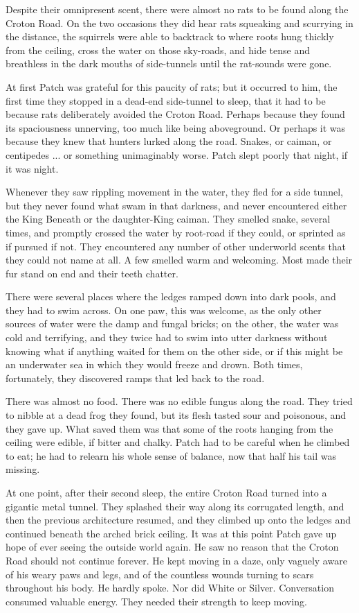 \documentclass[11pt]{article}
\begin{document}
 Despite their omnipresent scent, there were almost no rats to be found along the Croton Road. On the two occasions they did hear rats squeaking and scurrying in the distance, the squirrels were able to backtrack to where roots hung thickly from the ceiling, cross the water on those sky-roads, and hide tense and breathless in the dark mouths of side-tunnels until the rat-sounds were gone.\par
At first Patch was grateful for this paucity of rats; but it occurred to him, the first time they stopped in a dead-end side-tunnel to sleep, that it had to be because rats deliberately avoided the Croton Road. Perhaps because they found its spaciousness unnerving, too much like being aboveground. Or perhaps it was because they knew that hunters lurked along the road. Snakes, or caiman, or centipedes ... or something unimaginably worse. Patch slept poorly that night, if it was night.\par
Whenever they saw rippling movement in the water, they fled for a side tunnel, but they never found what swam in that darkness, and never encountered either the King Beneath or the daughter-King caiman. They smelled snake, several times, and promptly crossed the water by root-road if they could, or sprinted as if pursued if not. They encountered any number of other underworld scents that they could not name at all. A few smelled warm and welcoming. Most made their fur stand on end and their teeth chatter.\par
There were several places where the ledges ramped down into dark pools, and they had to swim across. On one paw, this was welcome, as the only other sources of water were the damp and fungal bricks; on the other, the water was cold and terrifying, and they twice had to swim into utter darkness without knowing what if anything waited for them on the other side, or if this might be an underwater sea in which they would freeze and drown. Both times, fortunately, they discovered ramps that led back to the road.\par
There was almost no food. There was no edible fungus along the road. They tried to nibble at a dead frog they found, but its flesh tasted sour and poisonous, and they gave up. What saved them was that some of the roots hanging from the ceiling were edible, if bitter and chalky. Patch had to be careful when he climbed to eat; he had to relearn his whole sense of balance, now that half his tail was missing.\par
 At one point, after their second sleep, the entire Croton Road turned into a gigantic metal tunnel. They splashed their way along its corrugated length, and then the previous architecture resumed, and they climbed up onto the ledges and continued beneath the arched brick ceiling. It was at this point Patch gave up hope of ever seeing the outside world again. He saw no reason that the Croton Road should not continue forever. He kept moving in a daze, only vaguely aware of his weary paws and legs, and of the countless wounds turning to scars throughout his body. He hardly spoke. Nor did White or Silver. Conversation consumed valuable energy. They needed their strength to keep moving.\par
\end{document}
